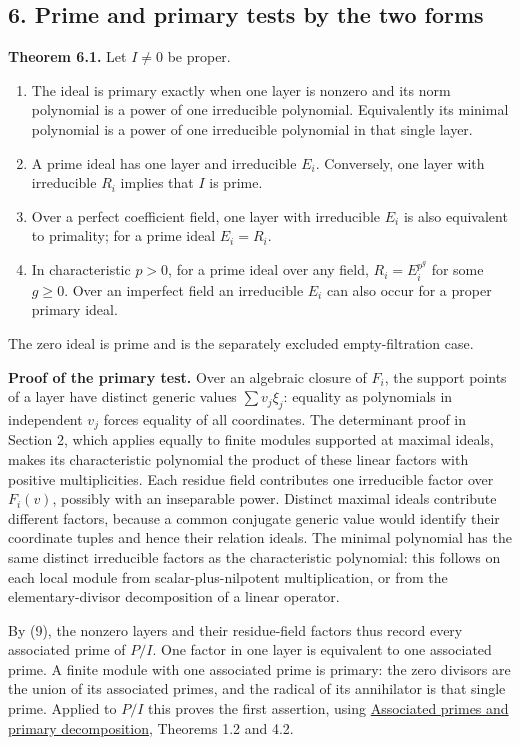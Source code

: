 \documentclass[
]{article}
\providecommand{\tightlist}{%
  \setlength{\itemsep}{0pt}\setlength{\parskip}{0pt}}
\begin{document}
\subsection{6. Prime and primary tests by the two
forms}\label{prime-and-primary-tests-by-the-two-forms}

\textbf{Theorem 6.1.} Let \(I\ne0\) be proper.

\begin{enumerate}
\def\labelenumi{\arabic{enumi}.}
\tightlist
\item
  The ideal is primary exactly when one layer is nonzero and its norm
  polynomial is a power of one irreducible polynomial. Equivalently its
  minimal polynomial is a power of one irreducible polynomial in that
  single layer.
\item
  A prime ideal has one layer and irreducible \(E_i\). Conversely, one
  layer with irreducible \(R_i\) implies that \(I\) is prime.
\item
  Over a perfect coefficient field, one layer with irreducible \(E_i\)
  is also equivalent to primality; for a prime ideal \(E_i=R_i\).
\item
  In characteristic \(p>0\), for a prime ideal over any field,
  \(R_i=E_i^{p^g}\) for some \(g\ge0\). Over an imperfect field an
  irreducible \(E_i\) can also occur for a proper primary ideal.
\end{enumerate}

The zero ideal is prime and is the separately excluded empty-filtration
case.

\textbf{Proof of the primary test.} Over an algebraic closure of
\(F_i\), the support points of a layer have distinct generic values
\(\sum v_j\xi_j\): equality as polynomials in independent \(v_j\) forces
equality of all coordinates. The determinant proof in Section 2, which
applies equally to finite modules supported at maximal ideals, makes its
characteristic polynomial the product of these linear factors with
positive multiplicities. Each residue field contributes one irreducible
factor over \(F_i(v)\), possibly with an inseparable power. Distinct
maximal ideals contribute different factors, because a common conjugate
generic value would identify their coordinate tuples and hence their
relation ideals. The minimal polynomial has the same distinct
irreducible factors as the characteristic polynomial: this follows on
each local module from scalar-plus-nilpotent multiplication, or from the
elementary-divisor decomposition of a linear operator.

By (9), the nonzero layers and their residue-field factors thus record
every associated prime of \(P/I\). One factor in one layer is equivalent
to one associated prime. A finite module with one associated prime is
primary: the zero divisors are the union of its associated primes, and
the radical of its annihilator is that single prime. Applied to \(P/I\)
this proves the first assertion, using
\href{../prerequisites/AG-CA/AG-CA-04.html}{Associated primes and
primary decomposition}, Theorems 1.2 and 4.2.
\end{document}
